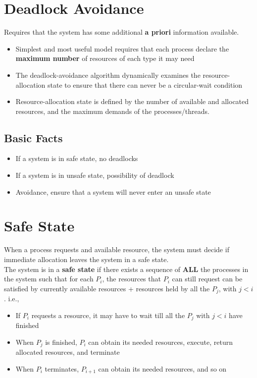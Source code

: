 \documentclass[oneside]{book}
\begin{document}
        \section{Deadlock Avoidance}
            Requires that the system has some additional \textbf{a priori} information available.\\
            \begin{itemize}
                \item Simplest and most useful model requires that each process declare the \textbf{maximum number} of resources
                of each type it may need
                \item The deadlock-avoidance algorithm dynamically examines the resource-allocation state to ensure that there can
                never be a circular-wait condition
                \item Resource-allocation state is defined by the number of available and allocated resources, and the maximum demands
                of the processes/threads.
            \end{itemize}
            \subsection{Basic Facts}
                \begin{itemize}
                    \item If a system is in safe state, no deadlocks
                    \item If a system is in unsafe state, possibility of deadlock
                    \item Avoidance, ensure that a system will never enter an unsafe state
                \end{itemize}
        \section{Safe State}
            When a process requests and available resource, the system must decide if immediate allocation leaves the system in 
            a safe state.\\
            The system is in a \textbf{safe state} if there exists a sequence of \textbf{ALL} the processes in the system such that
            for each $P_i$, the resources that $P_i$ can still request can be satisfied by currently available resources + resources 
            held by all the $P_j$, with $j < i$. i.e.,
            \begin{itemize}
                \item If $P_i$ requests a resource, it may have to wait till all the $P_j$ with $j < i$ have finished
                \item When $P_j$ is finished, $P_i$ can obtain its needed resources, execute, return allocated resources, and terminate
                \item When $P_i$ terminates, $P_{i+1}$ can obtain its needed resources, and so on
            \end{itemize}
\end{document}

